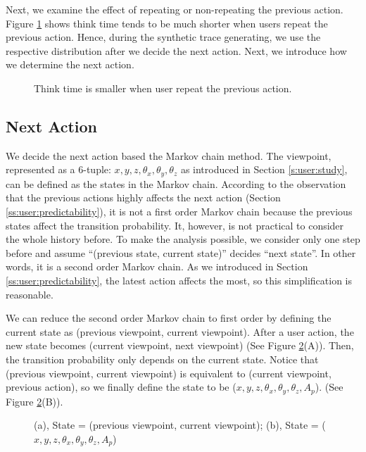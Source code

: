 Next, we examine the effect of repeating or non-repeating the previous action. 
Figure \ref{f:user:thinktime} shows %
think time tends to be much shorter when users repeat the previous action.
Hence, during the synthetic trace generating, we use the respective distribution after
we decide the next action. Next, we introduce how we determine the next action.
\begin{figure}
    \centering
    \caption{Think time is smaller when user repeat the previous action.}
    \label{f:user:thinktime}
\end{figure}

\subsection{Next Action}
We decide the next action based the Markov chain method.
The viewpoint, represented as a 6-tuple: {$x, y, z, \theta_x, \theta_y, \theta_z$}
as introduced in Section \ref{s:user:study}, can be defined as the states in the Markov chain.
According to the observation that the previous actions highly affects the next action
(Section \ref{ss:user:predictability}), it is not a first order Markov chain because
the previous states affect the transition probability. 
It, however, is not practical to consider the whole history before. 
To make the analysis possible, we consider only one step before and assume
``(previous state, current state)'' decides ``next state''. In other words, 
it is a second order Markov chain. 
As we introduced in Section \ref{ss:user:predictability}, the latest action affects the most, so
this simplification is reasonable.

We can reduce the second order Markov chain to first order by defining the current state as
(previous viewpoint, current viewpoint). After a user action, the new state becomes 
(current viewpoint, next viewpoint) (See Figure \ref{f:user:reduction}(A)). 
Then, the transition probability only depends on the current state.
Notice that (previous viewpoint, current viewpoint) is equivalent to (current viewpoint, previous action), 
so we finally define the state to be ($x, y, z, \theta_x, \theta_y, \theta_z, A_p$). 
(See Figure \ref{f:user:reduction}(B)).
\begin{figure}
    \centering
    \caption{(a), State = (previous viewpoint, current viewpoint); (b), State = ($x, y, z, \theta_x, \theta_y, \theta_z, A_p$)}
    \label{f:user:reduction}
\end{figure}

